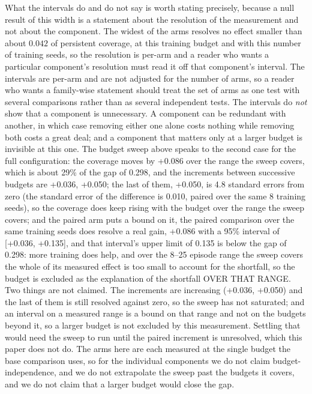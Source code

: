 What the intervals do and do not say is worth stating precisely, because a
null result of this width is a statement about the resolution of the
measurement and not about the component.  The widest of the arms resolves no effect smaller than about $0.042$ of persistent coverage, at this training budget and with this number of training seeds, so the resolution is per-arm and a reader who wants a particular component's resolution must read it off that component's interval.  The
intervals are per-arm and are not adjusted for the number of arms, so a
reader who wants a family-wise statement should treat the set of arms as
one test with several comparisons rather than as several independent
tests.  The intervals do \emph{not} show that a component is unnecessary.
A component can be redundant with another, in which case removing either
one alone costs nothing while removing both costs a great deal; and a
component that matters only at a larger budget is invisible at this one.
The budget sweep above speaks to the second case for the full
configuration: the coverage moves by +0.086 over the range the sweep covers, which is about 29\% of the gap of 0.298, and the increments between successive budgets are +0.036, +0.050; the last of them, +0.050, is 4.8 standard errors from zero (the standard error of the difference is 0.010, paired over the same 8 training seeds), so the coverage does keep rising with the budget over the range the sweep covers; and the paired arm puts a bound on it,
the paired comparison over the same training seeds does resolve a real gain, +0.086 with a 95\% interval of [+0.036, +0.135], and that interval's upper limit of 0.135 is below the gap of 0.298: more training does help, and over the 8--25 episode range the sweep covers the whole of its measured effect is too small to account for the shortfall, so the budget is excluded as the explanation of the shortfall OVER THAT RANGE.  Two things are not claimed.  The increments are increasing (+0.036, +0.050) and the last of them is still resolved against zero, so the sweep has not saturated; and an interval on a measured range is a bound on that range and not on the budgets beyond it, so a larger budget is not excluded by this measurement.  Settling that would need the sweep to run until the paired increment is unresolved, which this paper does not do.  The arms
here are each measured at the single budget the base comparison uses, so
for the individual components we do not claim budget-independence, and
we do not extrapolate the sweep past the budgets it covers, and we do not claim that a larger budget would close the gap.

